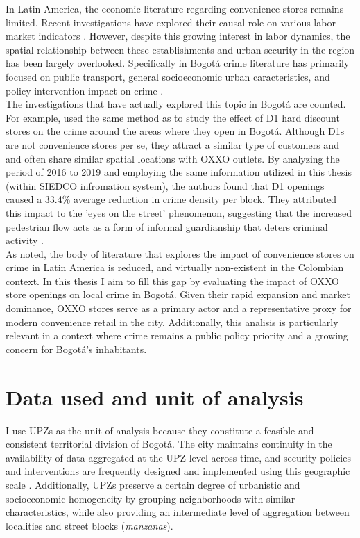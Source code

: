 \documentclass[12pt]{article}
\begin{document}
In Latin America, the economic literature regarding convenience stores remains limited. Recent investigations have explored their causal role on various labor market indicators \parencite{delgado2024, marcos2022}. However, despite this growing interest in labor dynamics, the spatial relationship between these establishments and urban security in the region has been largely overlooked. Specifically in Bogotá crime literature has primarily focused on public transport, general socioeconomic urban caracteristics, and policy intervention impact on crime \parencite{moreno2005impacto, bacares2013impact}.\\ 

The investigations that have actually explored this topic in Bogotá are counted. For example, \textcite{jaramillo2021low} used the same method as \textcite{shin2024dollar} to study the effect of D1 hard discount stores on the crime around the areas where they open in Bogotá. Although D1s are not convenience stores per se, they attract a similar type of customers and and often share similar spatial locations with OXXO outlets. By analyzing the period of 2016 to 2019 and employing the same information utilized in this thesis (within SIEDCO infromation system), the authors found that D1 openings caused a 33.4\% average reduction in crime density per block. They attributed this impact to the 'eyes on the street' phenomenon, suggesting that the increased pedestrian flow acts as a form of informal guardianship that deters criminal activity \parencite{jacobs1961death, jaramillo2021low}.\\ 

As noted, the body of literature that explores the impact of convenience stores on crime in Latin America is reduced, and virtually non-existent in the Colombian context. In this thesis I aim to fill this gap by evaluating the impact of OXXO store openings on local crime in Bogotá. Given their rapid expansion and market dominance, OXXO stores serve as a primary actor and a representative proxy for modern convenience retail in the city. Additionally, this analisis is particularly relevant in a context where crime remains a public policy priority and a growing concern for Bogotá’s inhabitants.

\section{Data used and unit of analysis}
\label{sec:Data}

I use UPZs as the unit of analysis because they constitute a feasible and consistent territorial division of Bogotá. The city maintains continuity in the availability of data aggregated at the UPZ level across time, and security policies and interventions are frequently designed and implemented using this geographic scale \parencite{garcia2016seguridadlocal}. Additionally, UPZs preserve a certain degree of urbanistic and socioeconomic homogeneity by grouping neighborhoods with similar characteristics, while also providing an intermediate level of aggregation between localities and street blocks (\textit{manzanas}).\\ 
\end{document}

